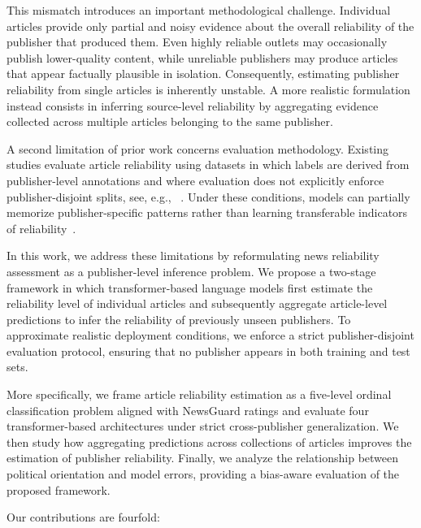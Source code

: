 \documentclass[journal]{IEEEtran}
\begin{document}
This mismatch introduces an important methodological challenge. Individual articles provide only partial and noisy evidence about the overall reliability of the publisher that produced them. Even highly reliable outlets may occasionally publish lower-quality content, while unreliable publishers may produce articles that appear factually plausible in isolation. Consequently, estimating publisher reliability from single articles is inherently unstable. A more realistic formulation instead consists in inferring source-level reliability by aggregating evidence collected across multiple articles belonging to the same publisher.

A second limitation of prior work concerns evaluation methodology. Existing studies evaluate article reliability using datasets in which labels are derived from publisher-level annotations and where evaluation does not explicitly enforce publisher-disjoint splits, see, e.g., ~\cite{burdisso-etal-2024-reliability, DBLP:journals/dbsk/AdjiLS26,batDataset}. 
Under these conditions, models can partially memorize publisher-specific patterns rather than learning transferable indicators of reliability~\cite{azizov-etal-2024-safari,verhoeven2025yesterday}.

In this work, we address these limitations by reformulating news reliability assessment as a publisher-level inference problem. We propose a two-stage framework in which transformer-based language models first estimate the reliability level of individual articles and subsequently aggregate article-level predictions to infer the reliability of previously unseen publishers. To approximate realistic deployment conditions, we enforce a strict publisher-disjoint evaluation protocol, ensuring that no publisher appears in both training and test sets.

More specifically, we frame article reliability estimation as a five-level ordinal classification problem aligned with NewsGuard ratings and evaluate four transformer-based architectures under strict cross-publisher generalization. We then study how aggregating predictions across collections of articles improves the estimation of publisher reliability. Finally, we analyze the relationship between political orientation and model errors, providing a bias-aware evaluation of the proposed framework.

Our contributions are fourfold:
\end{document}
